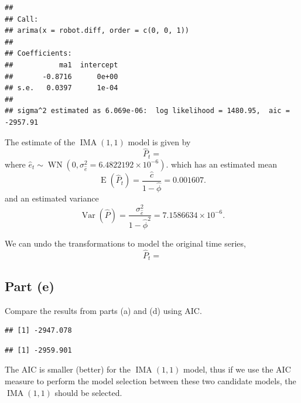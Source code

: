 \documentclass[
]{article}
\newenvironment{Shaded}{\begin{snugshade}}{\end{snugshade}}
\newcommand{\FunctionTok}[1]{\textcolor[rgb]{0.13,0.29,0.53}{\textbf{#1}}}
\newcommand{\NormalTok}[1]{#1}
\newcommand{\SpecialCharTok}[1]{\textcolor[rgb]{0.81,0.36,0.00}{\textbf{#1}}}
\begin{document}
\begin{verbatim}
## 
## Call:
## arima(x = robot.diff, order = c(0, 0, 1))
## 
## Coefficients:
##           ma1  intercept
##       -0.8716      0e+00
## s.e.   0.0397      1e-04
## 
## sigma^2 estimated as 6.069e-06:  log likelihood = 1480.95,  aic = -2957.91
\end{verbatim}

The estimate of the \(\operatorname{IMA}(1,1)\) model is given by \[
   \hat{P}_t = 
\] where
\(\hat{e}_t \sim \operatorname{WN}(0,\sigma_{\hat{e}}^2 = \ensuremath{6.4822192\times 10^{-6}})\).
which has an estimated mean \[
   \operatorname{E}(\hat{P}_t) = \frac{\hat{c}}{1-\hat\phi} = 0.001607.
\] and an estimated variance \[
   \operatorname{Var}(\hat{P}) = \frac{\sigma_{\hat{e}}^2}{1-\hat{\phi}^2} = \ensuremath{7.1586634\times 10^{-6}}.
\]

We can undo the transformations to model the original time series, \[
   \hat{P}_t = 
\]

\hypertarget{part-e}{%
\subsection{Part (e)}\label{part-e}}

Compare the results from parts (a) and (d) using AIC.

\begin{Shaded}
\end{Shaded}

\begin{verbatim}
## [1] -2947.078
\end{verbatim}

\begin{Shaded}
\end{Shaded}

\begin{verbatim}
## [1] -2959.901
\end{verbatim}

The AIC is smaller (better) for the \(\operatorname{IMA}(1,1)\) model,
thus if we use the AIC measure to perform the model selection between
these two candidate models, the \(\operatorname{IMA}(1,1)\) should be
selected.
\end{document}
